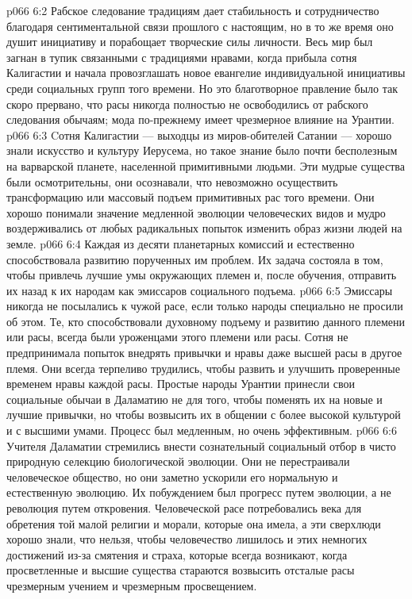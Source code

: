 \vs p066 6:2 Рабское следование традициям дает стабильность и сотрудничество благодаря сентиментальной связи прошлого с настоящим, но в то же время оно душит инициативу и порабощает творческие силы личности. Весь мир был загнан в тупик связанными с традициями нравами, когда прибыла сотня Калигастии и начала провозглашать новое евангелие индивидуальной инициативы среди социальных групп того времени. Но это благотворное правление было так скоро прервано, что расы никогда полностью не освободились от рабского следования обычаям; мода по\hyp{}прежнему имеет чрезмерное влияние на Урантии.
\vs p066 6:3 Cотня Калигастии --- выходцы из миров\hyp{}обителей Сатании --- хорошо знали искусство и культуру Иерусема, но такое знание было почти бесполезным на варварской планете, населенной примитивными людьми. Эти мудрые существа были осмотрительны, они осознавали, что невозможно осуществить  трансформацию или массовый подъем примитивных рас того времени. Они хорошо понимали значение медленной эволюции человеческих видов и мудро воздерживались от любых радикальных попыток изменить образ жизни людей на земле.
\vs p066 6:4 Каждая из десяти планетарных комиссий  и естественно способствовала развитию порученных им проблем. Их задача состояла в том, чтобы привлечь лучшие умы окружающих племен и, после обучения, отправить их назад к их народам как эмиссаров социального подъема.
\vs p066 6:5 Эмиссары никогда не посылались к чужой расе, если только народы специально не просили об этом. Те, кто способствовали духовному подъему и развитию данного племени или расы, всегда были уроженцами этого племени или расы. Сотня не предпринимала попыток внедрять привычки и нравы даже высшей расы в другое племя. Они всегда терпеливо трудились, чтобы развить и улучшить проверенные временем нравы каждой расы. Простые народы Урантии принесли свои социальные обычаи в Даламатию не для того, чтобы поменять их на новые и лучшие привычки, но чтобы возвысить их в общении с более высокой культурой и с высшими умами. Процесс был медленным, но очень эффективным.
\vs p066 6:6 Учителя Даламатии стремились внести сознательный социальный отбор в чисто природную селекцию биологической эволюции. Они не перестраивали человеческое общество, но они заметно ускорили его нормальную и естественную эволюцию. Их побуждением был прогресс путем эволюции, а не революция путем откровения. Человеческой расе потребовались века для обретения той малой религии и морали, которые она имела, а эти сверхлюди хорошо знали, что нельзя, чтобы человечество лишилось и этих немногих достижений из\hyp{}за смятения и страха, которые всегда возникают, когда просветленные и высшие существа стараются возвысить отсталые расы чрезмерным учением и чрезмерным просвещением.
